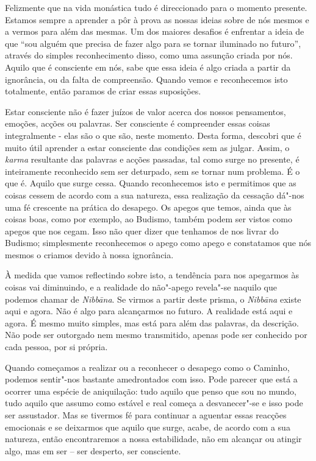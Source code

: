 Felizmente que na vida monástica tudo é direccionado para o momento
presente. Estamos sempre a aprender a pôr à prova as nossas ideias sobre
de nós mesmos e a vermos para além das mesmas. Um dos maiores desafios é
enfrentar a ideia de que ``sou alguém que precisa de fazer algo para se
tornar iluminado no futuro'', através do simples reconhecimento disso,
como uma assunção criada por nós. Aquilo que é consciente em nós, sabe
que essa ideia é algo criada a partir da ignorância, ou da falta de
compreensão. Quando vemos e reconhecemos isto totalmente, então paramos
de criar essas suposições.

Estar consciente não é fazer juízos de valor acerca dos nossos
pensamentos, emoções, acções ou palavras. Ser consciente é compreender
essas coisas integralmente - elas são o que são, neste momento. Desta
forma, descobri que é muito útil aprender a estar consciente das
condições sem as julgar. Assim, o \emph{karma} resultante das palavras e
acções passadas, tal como surge no presente, é inteiramente reconhecido
sem ser deturpado, sem se tornar num problema. É o que é. Aquilo que
surge cessa. Quando reconhecemos isto e permitimos que as coisas cessem
de acordo com a sua natureza, essa realização da cessação dá"-nos uma fé
crescente na prática do desapego. Os apegos que temos, ainda que às
coisas boas, como por exemplo, ao Budismo, também podem ser vistos como
apegos que nos cegam. Isso não quer dizer que tenhamos de nos livrar do
Budismo; simplesmente reconhecemos o apego como apego e constatamos que
nós mesmos o criamos devido à nossa ignorância.

À medida que vamos reflectindo sobre isto, a tendência para nos
apegarmos às coisas vai diminuindo, e a realidade do não"-apego revela"-se
naquilo que podemos chamar de \emph{Nibbāna}. Se virmos a partir deste
prisma, o \emph{Nibbāna} existe aqui e agora. Não é algo para
alcançarmos no futuro. A realidade está aqui e agora. É mesmo muito
simples, mas está para além das palavras, da descrição. Não pode ser
outorgado nem mesmo transmitido, apenas pode ser conhecido por cada
pessoa, por si própria.

Quando começamos a realizar ou a reconhecer o desapego como o Caminho,
podemos sentir"-nos bastante amedrontados com isso. Pode parecer que está
a ocorrer uma espécie de aniquilação: tudo aquilo que penso que sou no
mundo, tudo aquilo que assumo como estável e real começa a desvanecer"-se
e isso pode ser assustador. Mas se tivermos fé para continuar a aguentar
essas reacções emocionais e se deixarmos que aquilo que surge, acabe, de
acordo com a sua natureza, então encontraremos a nossa estabilidade, não
em alcançar ou atingir algo, mas em ser -- ser desperto, ser consciente.

